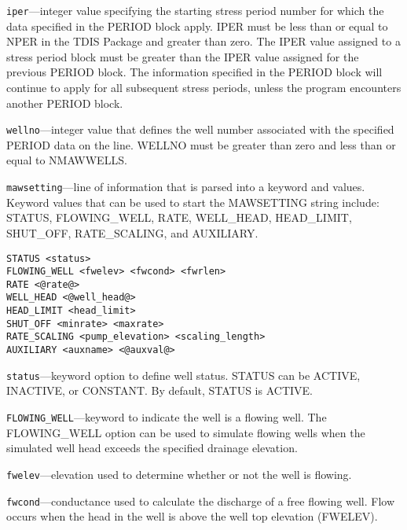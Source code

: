 \begin{description}
\item \texttt{iper}---integer value specifying the starting stress period number for which the data specified in the PERIOD block apply.  IPER must be less than or equal to NPER in the TDIS Package and greater than zero.  The IPER value assigned to a stress period block must be greater than the IPER value assigned for the previous PERIOD block.  The information specified in the PERIOD block will continue to apply for all subsequent stress periods, unless the program encounters another PERIOD block.

\item \texttt{wellno}---integer value that defines the well number associated with the specified PERIOD data on the line. WELLNO must be greater than zero and less than or equal to NMAWWELLS.

\item \texttt{mawsetting}---line of information that is parsed into a keyword and values.  Keyword values that can be used to start the MAWSETTING string include: STATUS, FLOWING\_WELL, RATE, WELL\_HEAD, HEAD\_LIMIT, SHUT\_OFF, RATE\_SCALING, and AUXILIARY.

\begin{lstlisting}[style=blockdefinition]
STATUS <status>
FLOWING_WELL <fwelev> <fwcond> <fwrlen> 
RATE <@rate@>
WELL_HEAD <@well_head@>
HEAD_LIMIT <head_limit>
SHUT_OFF <minrate> <maxrate> 
RATE_SCALING <pump_elevation> <scaling_length> 
AUXILIARY <auxname> <@auxval@> 
\end{lstlisting}

\item \texttt{status}---keyword option to define well status.  STATUS can be ACTIVE, INACTIVE, or CONSTANT. By default, STATUS is ACTIVE.

\item \texttt{FLOWING\_WELL}---keyword to indicate the well is a flowing well.  The FLOWING\_WELL option can be used to simulate flowing wells when the simulated well head exceeds the specified drainage elevation.

\item \texttt{fwelev}---elevation used to determine whether or not the well is flowing.

\item \texttt{fwcond}---conductance used to calculate the discharge of a free flowing well.  Flow occurs when the head in the well is above the well top elevation (FWELEV).


\end{description}
